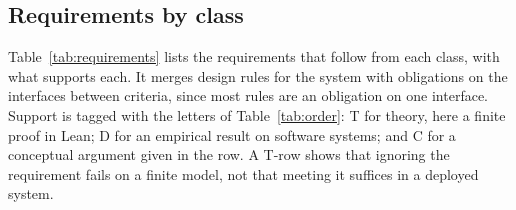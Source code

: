 \documentclass[11pt]{article}
\begin{document}
\subsection{Requirements by class}
\label{sec:requirements}

Table~\ref{tab:requirements} lists the requirements that follow from each class, with what supports each.
It merges design rules for the system with obligations on the interfaces between criteria, since most rules are an obligation on one interface.
Support is tagged with the letters of Table~\ref{tab:order}: T for theory, here a finite proof in Lean; D for an empirical result on software systems; and C for a conceptual argument given in the row.
A T-row shows that ignoring the requirement fails on a finite model, not that meeting it suffices in a deployed system.
\end{document}
